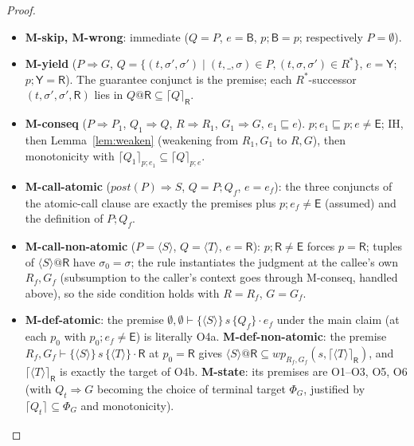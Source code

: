 \documentclass[11pt]{article}
\theoremstyle{plain}
\theoremstyle{plain}
\theoremstyle{definition}
\newcommand{\MY}{\mathsf{Y}}
\newcommand{\MB}{\mathsf{B}}
\newcommand{\MR}{\mathsf{R}}
\newcommand{\ME}{\mathsf{E}}
\newcommand{\sq}{\sqsubseteq}
\newcommand{\wpx}{\mathit{wp}}
\newcommand{\stp}{\mathit{st}}
\newcommand{\one}[1]{\langle #1\rangle}
\newcommand{\postp}{\mathit{post}}
\newcommand{\upemb}[2]{\lceil #1\rceil_{#2}}     %
\newcommand{\kwhile}{\mathtt{while}}
\begin{document}
\begin{proof}
\begin{itemize}[leftmargin=1.4em]
  $\stp(A_2,\upemb{Q}{p;e})$: a successor via $A_2$ sits in $P;A_2=Q$ at
  $\MR;m_\sigma\sq\MR;M(A_2,P) = \MR;e_{\mathit{it}}^*;M(A_2,P)\sq\MR;e$.
  Hence $W\subseteq\nu W'.\,F(W')$, i.e.
  $P@\MR\subseteq\wpx(\kwhile\ldots,\upemb{Q}{\MR;e})$.
\item \textbf{M-skip, M-wrong}: immediate ($Q=P$, $e=\MB$, $p;\MB=p$; respectively
  $P=\emptyset$).
\item \textbf{M-yield} ($P\Rightarrow G$,
  $Q = \{(t,\sigma',\sigma')\mid(t,\_,\sigma)\in P, (t,\sigma,\sigma')\in R^*\}$,
  $e=\MY$; $p;\MY=\MR$). The guarantee conjunct is the premise; each
  $R^*$-successor $(t,\sigma',\sigma',\MR)$ lies in $Q@\MR\subseteq\upemb{Q}{\MR}$.
\item \textbf{M-conseq} ($P\Rightarrow P_1$, $Q_1\Rightarrow Q$, $R\Rightarrow R_1$,
  $G_1\Rightarrow G$, $e_1\sq e$). $p;e_1\sq p;e\neq\ME$; IH, then
  Lemma~\ref{lem:weaken} (weakening from $R_1,G_1$ to $R,G$), then monotonicity
  with $\upemb{Q_1}{p;e_1}\subseteq\upemb{Q}{p;e}$.
\item \textbf{M-call-atomic} ($\postp(P)\Rightarrow S$, $Q = P;Q_f$, $e = e_f$):
  the three conjuncts of the atomic-call clause are exactly the premises plus
  $p;e_f\neq\ME$ (assumed) and the definition of $P;Q_f$.
\item \textbf{M-call-non-atomic} ($P=\one{S}$, $Q=\one{T}$, $e=\MR$):
  $p;\MR\neq\ME$ forces $p=\MR$; tuples of $\one{S}@\MR$ have $\sigma_0=\sigma$;
  the rule instantiates the judgment at the callee's own $R_f,G_f$ (subsumption to
  the caller's context goes through M-conseq, handled above), so the side
  condition holds with $R = R_f$, $G = G_f$.
\item \textbf{M-def-atomic}: the premise
  $\emptyset,\emptyset\vdash\{\one{S}\}\,s\,\{Q_f\}\cdot e_f$ under the main claim
  (at each $p_0$ with $p_0;e_f\neq\ME$) is literally O4a.
  \textbf{M-def-non-atomic}: the premise
  $R_f,G_f\vdash\{\one{S}\}\,s\,\{\one{T}\}\cdot\MR$ at $p_0=\MR$ gives
  $\one{S}@\MR\subseteq\wpx_{R_f,G_f}(s,\upemb{\one{T}}{\MR})$, and
  $\upemb{\one{T}}{\MR}$ is exactly the target of O4b. \textbf{M-state}: its
  premises are O1--O3, O5, O6 (with $Q_t\Rightarrow G$ becoming the choice of
  terminal target $\Phi_G$, justified by $\upemb{Q_t}{}\subseteq\Phi_G$ and
  monotonicity).\qedhere
\end{itemize}
\end{proof}
\end{document}
